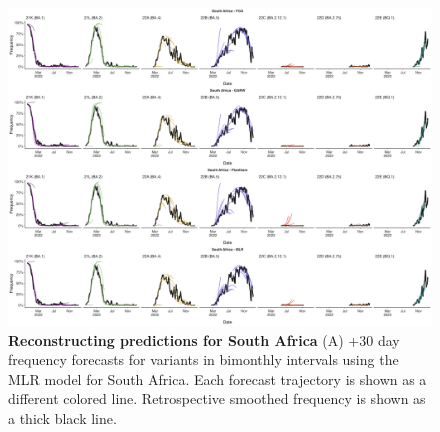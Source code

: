 \begin{figure}[th!]
	\centering
	\includegraphics[width=0.9\textwidth=0.01]{supp_figures/supplementary_fig_South Africa.png}
	\caption[\textbf{Reconstructing predictions for South Africa}]{
		\textbf{Reconstructing predictions for South Africa}
		(A) +30 day frequency forecasts for variants in bimonthly intervals using the MLR model for South Africa.
		Each forecast trajectory is shown as a different colored line.
		Retrospective smoothed frequency is shown as a thick black line.
	}
	\label{fig:S4}
\end{figure}


